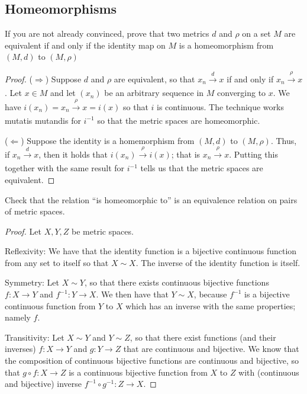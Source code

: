 \subsection{Homeomorphisms}


\begin{exercise}{43}
If you are not already convinced, prove that two metrics $d$ and $\rho$ on a set $M$ are equivalent if and only if the identity map on $M$ is a homeomorphism from $(M,d)$ to $(M,\rho)$
\end{exercise}
\begin{proof}
($\Rightarrow$)
Suppose $d$ and $\rho$ are equivalent, so that  $x_n\xrightarrow[]{d}x$ if and only if $x_n\xrightarrow[]{\rho}x$.
Let $x\in M$ and let $(x_n)$ be an arbitrary sequence in $M$ converging to $x$.
We have $i(x_n)=x_n\xrightarrow[]{\rho}x=i(x)$ so that $i$ is continuous.
The technique works mutatis mutandis for $i^{-1}$ so that the metric spaces are homeomorphic.

($\Leftarrow$)
Suppose the identity is a homemorphism from $(M,d)$ to $(M,\rho)$.
Thus, if $x_n\xrightarrow[]{d} x$, then it holds that $i(x_n)\xrightarrow[]{\rho} i(x)$; that is $x_n\xrightarrow[]{\rho} x$.
Putting this together with the same result for $i^{-1}$ tells us that the metric spaces are equivalent.
\end{proof} 

\begin{exercise}{44}
Check that the relation ``is homeomorphic to'' is an equivalence relation on pairs of metric spaces.
\end{exercise}
\begin{proof}
Let $X, Y, Z$ be metric spaces.

Reflexivity:
We have that the identity function is a bijective continuous function from any set to itself so that $X\sim X$.
The inverse of the identity function is itself.

Symmetry:
Let $X\sim Y$, so that there exists continuous bijective functions $f:X\to Y$ and $f^{-1}:Y\to X$.
We then have that $Y\sim X$, because $f^{-1}$ is a bijective continuous function from $Y$ to $X$ which has an inverse with the same properties;
namely $f$.

Transitivity:
Let $X\sim Y$ and $Y\sim Z$, so that there exist functions (and their inverses) $f:X\to Y$ and $g:Y\to Z$ that are continuous and bijective.
We know that the composition of continuous bijective functions are continuous and bijective, so that $g\circ f:X\to Z$ is a continuous bijective function from $X$ to $Z$ with (continuous and bijective) inverse $f^{-1}\circ g^{-1}: Z\to X$.
\end{proof} 

